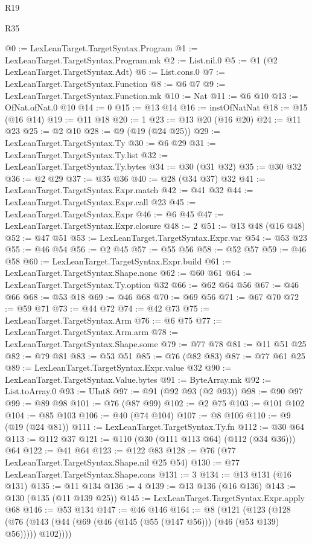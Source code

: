 \begin{lexlean}{R19}
\begin{lexlean}{R35}
\begin{coremodule}
{{{{{{{@0 := LexLeanTarget.TargetSyntax.Program
@1 := LexLeanTarget.TargetSyntax.Program.mk
@2 := List.nil.{0}
@5 := @1 (@2 LexLeanTarget.TargetSyntax.Adt)
@6 := List.cons.{0}
@7 := LexLeanTarget.TargetSyntax.Function
@8 := @6 @7
@9 := LexLeanTarget.TargetSyntax.Function.mk
@10 := Nat
@11 := @6 @10
@13 := OfNat.ofNat.{0} @10
@14 := 0
@15 := @13 @14
@16 := instOfNatNat
@18 := @15 (@16 @14)
@19 := @11 @18
@20 := 1
@23 := @13 @20 (@16 @20)
@24 := @11 @23
@25 := @2 @10
@28 := @9 (@19 (@24 @25))
@29 := LexLeanTarget.TargetSyntax.Ty
@30 := @6 @29
@31 := LexLeanTarget.TargetSyntax.Ty.list
@32 := LexLeanTarget.TargetSyntax.Ty.bytes
@34 := @30 (@31 @32)
@35 := @30 @32
@36 := @2 @29
@37 := @35 @36
@40 := @28 (@34 @37) @32
@41 := LexLeanTarget.TargetSyntax.Expr.match
@42 := @41 @32
@44 := LexLeanTarget.TargetSyntax.Expr.call @23
@45 := LexLeanTarget.TargetSyntax.Expr
@46 := @6 @45
@47 := LexLeanTarget.TargetSyntax.Expr.closure
@48 := 2
@51 := @13 @48 (@16 @48)
@52 := @47 @51
@53 := LexLeanTarget.TargetSyntax.Expr.var
@54 := @53 @23
@55 := @46 @54
@56 := @2 @45
@57 := @55 @56
@58 := @52 @57
@59 := @46 @58
@60 := LexLeanTarget.TargetSyntax.Expr.build
@61 := LexLeanTarget.TargetSyntax.Shape.none
@62 := @60 @61
@64 := LexLeanTarget.TargetSyntax.Ty.option @32
@66 := @62 @64 @56
@67 := @46 @66
@68 := @53 @18
@69 := @46 @68
@70 := @69 @56
@71 := @67 @70
@72 := @59 @71
@73 := @44 @72
@74 := @42 @73
@75 := LexLeanTarget.TargetSyntax.Arm
@76 := @6 @75
@77 := LexLeanTarget.TargetSyntax.Arm.arm
@78 := LexLeanTarget.TargetSyntax.Shape.some
@79 := @77 @78
@81 := @11 @51 @25
@82 := @79 @81
@83 := @53 @51
@85 := @76 (@82 @83)
@87 := @77 @61 @25
@89 := LexLeanTarget.TargetSyntax.Expr.value @32
@90 := LexLeanTarget.TargetSyntax.Value.bytes
@91 := ByteArray.mk
@92 := List.toArray.{0}
@93 := UInt8
@97 := @91 (@92 @93 (@2 @93))
@98 := @90 @97
@99 := @89 @98
@101 := @76 (@87 @99)
@102 := @2 @75
@103 := @101 @102
@104 := @85 @103
@106 := @40 (@74 @104)
@107 := @8 @106
@110 := @9 (@19 (@24 @81))
@111 := LexLeanTarget.TargetSyntax.Ty.fn
@112 := @30 @64
@113 := @112 @37
@121 := @110 (@30 (@111 @113 @64) (@112 (@34 @36))) @64
@122 := @41 @64
@123 := @122 @83
@128 := @76 (@77 LexLeanTarget.TargetSyntax.Shape.nil @25 @54)
@130 := @77 LexLeanTarget.TargetSyntax.Shape.cons
@131 := 3
@134 := @13 @131 (@16 @131)
@135 := @11 @134
@136 := 4
@139 := @13 @136 (@16 @136)
@143 := @130 (@135 (@11 @139 @25))
@145 := LexLeanTarget.TargetSyntax.Expr.apply @68
@146 := @53 @134
@147 := @46 @146
@164 := @8
    (@121
      (@123
        (@128 (@76 (@143 (@44 (@69 (@46 (@145 (@55 (@147 @56))) (@46 (@53 @139) @56))))) @102))))
}}}}}}}
\end{coremodule}
\end{lexlean}
\end{lexlean}
